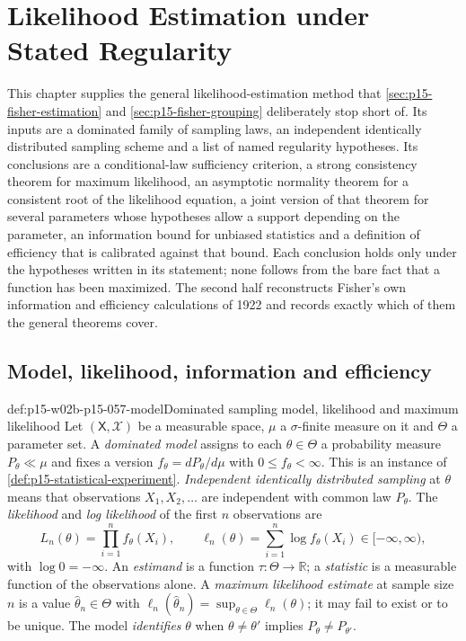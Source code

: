 \chapter{Likelihood Estimation under Stated Regularity}
\label{sec:p15-w02b-p15-057}

This chapter supplies the general likelihood-estimation method that
\cref{sec:p15-fisher-estimation} and \cref{sec:p15-fisher-grouping}
deliberately stop short of. Its inputs are a dominated family of sampling
laws, an independent identically distributed sampling scheme and a list of
named regularity hypotheses. Its conclusions are a conditional-law
sufficiency criterion, a strong consistency theorem for maximum likelihood,
an asymptotic normality theorem for a consistent root of the likelihood
equation, a joint version of that theorem for several parameters whose
hypotheses allow a support depending on the parameter, an information bound for unbiased statistics and a definition of
efficiency that is calibrated against that bound. Each conclusion holds only
under the hypotheses written in its statement; none follows from the bare
fact that a function has been maximized. The second half reconstructs
Fisher's own information and efficiency calculations of 1922 and records
exactly which of them the general theorems cover.

\section{Model, likelihood, information and efficiency}
\label{sec:p15-w02b-p15-057-model}

\begin{hbdefinition}{def:p15-w02b-p15-057-model}{Dominated sampling model, likelihood and maximum likelihood}
Let \((\mathsf X,\mathscr X)\) be a measurable space, \(\mu\) a
\(\sigma\)-finite measure on it and \(\Theta\) a parameter set. A
\emph{dominated model} assigns to each \(\theta\in\Theta\) a probability
measure \(P_\theta\ll\mu\) and fixes a version
\(f_\theta=dP_\theta/d\mu\) with \(0\leq f_\theta<\infty\). This is an
instance of \cref{def:p15-statistical-experiment}.
\emph{Independent identically distributed sampling} at \(\theta\) means
that observations \(X_1,X_2,\ldots\) are independent with common law
\(P_\theta\). The \emph{likelihood} and \emph{log likelihood} of the first
\(n\) observations are
\[
 L_n(\theta)=\prod_{i=1}^nf_\theta(X_i),\qquad
 \ell_n(\theta)=\sum_{i=1}^n\log f_\theta(X_i)\in[-\infty,\infty),
\]
with \(\log0=-\infty\). An \emph{estimand} is a function
\(\tau:\Theta\to\mathbb R\); a \emph{statistic} is a measurable function of
the observations alone. A \emph{maximum likelihood estimate} at sample size
\(n\) is a value \(\widehat\theta_n\in\Theta\) with
\(\ell_n(\widehat\theta_n)=\sup_{\theta\in\Theta}\ell_n(\theta)\); it may
fail to exist or to be unique. The model \emph{identifies} \(\theta\) when
\(\theta\neq\theta'\) implies \(P_\theta\neq P_{\theta'}\).
\end{hbdefinition}

